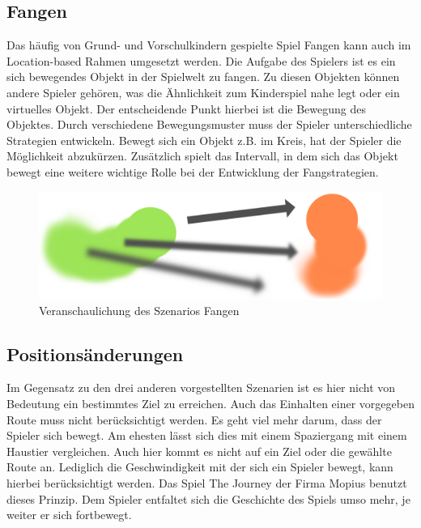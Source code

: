 \subsection{Fangen} 
\label{sec:szenarioFangen}
Das häufig von Grund- und Vorschulkindern gespielte Spiel Fangen kann auch im Location-based Rahmen umgesetzt werden. Die Aufgabe des Spielers ist es ein sich bewegendes Objekt in der Spielwelt zu fangen. Zu diesen Objekten können andere Spieler gehören, was die Ähnlichkeit zum Kinderspiel nahe legt oder ein virtuelles Objekt. Der entscheidende Punkt hierbei ist die Bewegung des Objektes. Durch verschiedene Bewegungsmuster muss der Spieler unterschiedliche Strategien entwickeln. Bewegt sich ein Objekt z.B. im Kreis, hat der Spieler die Möglichkeit abzukürzen. Zusätzlich spielt das Intervall, in dem sich das Objekt bewegt eine weitere wichtige Rolle bei der Entwicklung der Fangstrategien.
\cite{Misund:2009ge}

\begin{figure}[h]
    \centering
    \includegraphics[width=.8\textwidth]{files/lbgArten/chaseAndCatch}
    \caption{Veranschaulichung des Szenarios Fangen}
\end{figure}

\subsection{Positionsänderungen} 
\label{sec:szenarioPosition}
Im Gegensatz zu den drei anderen vorgestellten Szenarien ist es hier nicht von Bedeutung ein bestimmtes Ziel zu erreichen. Auch das Einhalten einer vorgegeben Route muss nicht berücksichtigt werden. Es geht viel mehr darum, dass der Spieler sich bewegt. Am ehesten lässt sich dies mit einem Spaziergang mit einem Haustier vergleichen. Auch hier kommt es nicht auf ein Ziel oder die gewählte Route an. Lediglich die Geschwindigkeit mit der sich ein Spieler bewegt, kann hierbei berücksichtigt werden. 
Das Spiel The Journey der Firma Mopius benutzt dieses Prinzip. Dem Spieler entfaltet sich die Geschichte des Spiels umso mehr, je weiter er sich fortbewegt.
\cite{mopius:PZPdJF8n}

